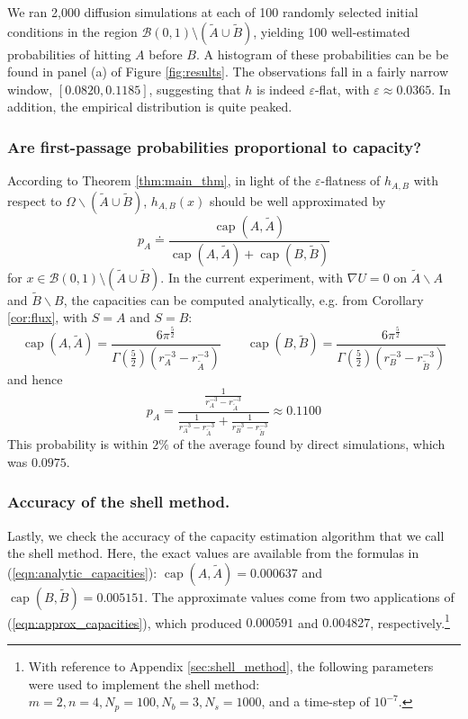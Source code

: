 \documentclass[nofootinbib,english, aip, jcp, priprint, graphicx,floatfix]{revtex4-1}
\theoremstyle{plain}
\theoremstyle{definition}
\theoremstyle{plain}
\newcommand{\capac}[2]{\ensuremath{\operatorname{cap}}(#1,#2)}
\newcommand{\tA}{{\tilde A}}
\newcommand{\tB}{{\tilde B}}
\begin{document}
We ran 2,000 diffusion simulations at each of 100 randomly selected initial conditions in the region $\mathcal{B}(0, 1) \setminus (\tilde{A} \cup \tilde{B})$, yielding 100 well-estimated probabilities of hitting $A$ before $B$. A histogram of these probabilities can be be found in panel (a) of Figure \ref{fig:results}. The observations fall in a fairly narrow window, $[0.0820, 0.1185]$, suggesting that $h$ is indeed $\varepsilon$-flat, with $\varepsilon \approx 0.0365$. In addition, the empirical distribution is quite peaked.

\subsubsection{Are first-passage probabilities proportional to capacity?}
\label{sec:toy_capacity}
According to Theorem \ref{thm:main_thm},
in light of the $\varepsilon$-flatness of 
$h_{A,B}$  with respect to $\Omega\backslash(\tA\cup\tB)$, 
$h_{A,B}(x)$ should be well approximated by 
\begin{equation}
\label{eqn:capacity_ratio}
p_A \doteq \frac{\capac{A}{\tA}}{\capac{A}{\tA}+\capac{B}{\tB}}
\end{equation}
for $x\in 
\mathcal{B}(0, 1) \setminus (\tilde{A} \cup \tilde{B})$. 
In the current experiment, with $\nabla U=0$ on 
$\tA\backslash A$ and $\tB\backslash B$, the capacities can be computed analytically, e.g. from Corollary \ref{cor:flux}, 
with $S=A$ and $S=B$:
\begin{equation}
\label{eqn:analytic_capacities}
\capac{A}{\tA}  =
\frac{6\pi^{\frac{5}{2}}}
{\Gamma(\frac{5}{2})(r_A^{-3} - r_\tA^{-3})}  \qquad
\capac{B}{\tB}  =
\frac{6\pi^{\frac{5}{2}}}
{\Gamma(\frac{5}{2})(r_B^{-3} - r_\tB^{-3})}
\end{equation}
and hence 
\begin{equation*}
p_A = \frac{\frac{1}{r_A^{-3} - r_{\tilde{A}}^{-3}}}{\frac{1}{r_A^{-3} - r_{\tilde{A}}^{-3}} + \frac{1}{r_B^{-3} - r_{\tilde{B}}^{-3}}}
\approx 0.1100
\end{equation*}
This probability is within $2\%$ of the average found by direct simulations, which was $0.0975$. 

\subsubsection{Accuracy of the shell method.}
\label{sec:toy_shell}
Lastly, we check the accuracy of the capacity estimation algorithm that we call the shell method. Here, the exact values are available from the formulas in (\ref{eqn:analytic_capacities}):
$\capac{A}{\tA}=0.000637$ and $\capac{B}{\tB}=0.005151$. 
The approximate values come from two applications of (\ref{eqn:approx_capacities}), which produced $0.000591$ and $0.004827$, respectively.\footnote{With reference to Appendix \ref{sec:shell_method}, the following parameters were used to implement the shell method:
$m = 2, n = 4, N_p = 100, N_b = 3, N_s = 1000$, and a time-step of 
$10^{-7}$.}
\end{document}
